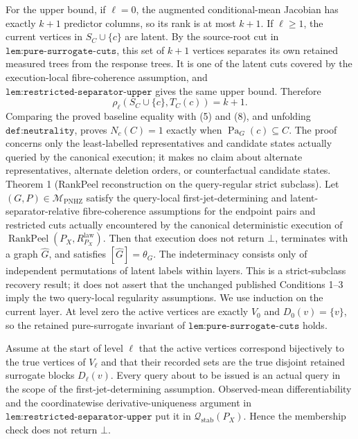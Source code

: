 For the upper bound, if \(\ell=0\), the augmented conditional-mean Jacobian has exactly \(k+1\) predictor columns, so its rank is at most \(k+1\).  If \(\ell\geq1\), the current vertices in \(S_C\cup\{c\}\) are latent.  By the source-root cut in \(\texttt{lem:pure-surrogate-cuts}\), this set of \(k+1\) vertices separates its own retained measured trees from the response trees.  It is one of the latent cuts covered by the execution-local fibre-coherence assumption, and \(\texttt{lem:restricted-separator-upper}\) gives the same upper bound.  Therefore
\[
 \rho_\ell(S_C\cup\{c\},T_C(c))=k+1. \tag{8}
\]
Comparing the proved baseline equality with (5) and (8), and unfolding \(\texttt{def:neutrality}\), proves \(N_c(C)=1\) exactly when \(\operatorname{Pa}_G(c)\subseteq C\).  The proof concerns only the least-labelled representatives and candidate states actually queried by the canonical execution; it makes no claim about alternate representatives, alternate deletion orders, or counterfactual candidate states.
Theorem 1 (RankPeel reconstruction on the query-regular strict subclass).  Let \((G,P)\in\mathcal M_{\mathrm{PNHZ}}\) satisfy the query-local first-jet-determining and latent-separator-relative fibre-coherence assumptions for the endpoint pairs and restricted cuts actually encountered by the canonical deterministic execution of \(\operatorname{RankPeel}(P_X,R^{\mathrm{law}}_{P_X})\).  Then that execution does not return \(\bot\), terminates with a graph \(\widehat G\), and satisfies \([\widehat G]=\theta_G\).  The indeterminacy consists only of independent permutations of latent labels within layers.  This is a strict-subclass recovery result; it does not assert that the unchanged published Conditions 1--3 imply the two query-local regularity assumptions.
We use induction on the current layer.  At level zero the active vertices are exactly \(V_0\) and \(D_0(v)=\{v\}\), so the retained pure-surrogate invariant of \(\texttt{lem:pure-surrogate-cuts}\) holds.

Assume at the start of level \(\ell\) that the active vertices correspond bijectively to the true vertices of \(V_\ell\) and that their recorded sets are the true disjoint retained surrogate blocks \(D_\ell(v)\).  Every query about to be issued is an actual query in the scope of the first-jet-determining assumption.  Observed-mean differentiability and the coordinatewise derivative-uniqueness argument in \(\texttt{lem:restricted-separator-upper}\) put it in \(\mathcal Q_{\mathrm{stab}}(P_X)\).  Hence the membership check does not return \(\bot\).

